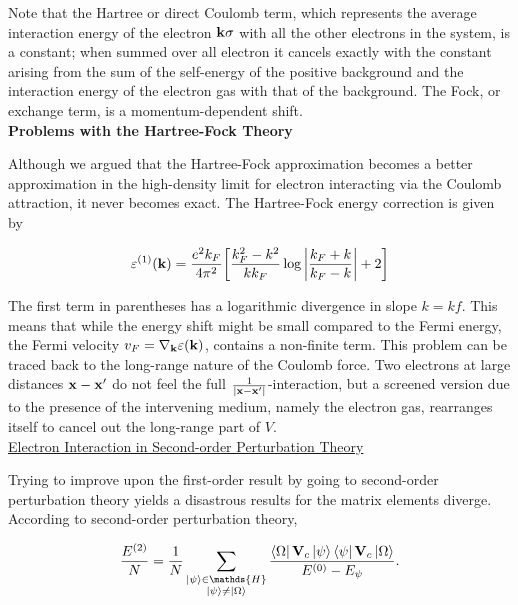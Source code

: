 Note that the Hartree or direct Coulomb term, which represents the average interaction energy of the electron ${\bf k}\sigma$ with all the other electrons in the system, is a constant; when summed over all electron it cancels exactly with the constant arising from the sum of the self-energy of the positive background and the interaction energy of the electron gas with that of the background. The Fock, or exchange term, is a momentum-dependent shift. \\

\textbf{Problems with the Hartree-Fock Theory}

Although we argued that the Hartree-Fock approximation becomes a better approximation in the high-density limit for electron interacting via the Coulomb attraction, it never becomes exact. The Hartree-Fock energy correction is given by 

$$
    \varepsilon^{(1)}({\bf k}) = \frac{e^2 k_F}{4\pi^2} \bigg[\frac{k_F^2 - k^2}{kk_F} \log \bigg| \frac{k_F + k}{k_F - k}\bigg| + 2\bigg]
$$

The first term in parentheses has a logarithmic divergence in slope $k=kf$. This means that while the energy shift might be small compared to the Fermi energy, the Fermi velocity $v_F = \nabla_{{\bf k}} \varepsilon({\bf k})$, contains a non-finite term. This problem can be traced back to the long-range nature of the Coulomb force. Two electrons at large distances ${\bf x}-{\bf x}'$ do not feel the full $\frac{1}{|{\bf x}-{\bf x}'|}$-interaction, but a screened version due to the presence of the intervening medium, namely the electron gas, rearranges itself to cancel out the long-range part of $V$. \\

\underline{Electron Interaction in Second-order Perturbation Theory}

Trying to improve upon the first-order result by going to second-order perturbation theory yields a disastrous results for the matrix elements diverge. According to second-order perturbation theory, 

\begin{equation}
\frac{E^{(2)}}{N} = \frac{1}{N} \sum_{\substack{\ket{\psi} \in \mathds{H} \\
\ket{\psi} \neq \ket{\Omega}}} \frac{\bra{\Omega} {{\bf V}}_c \ket{\psi} \bra{\psi} {{\bf V}}_c \ket{\Omega}}{E^{(0)} - E_\psi}.
\end{equation}

